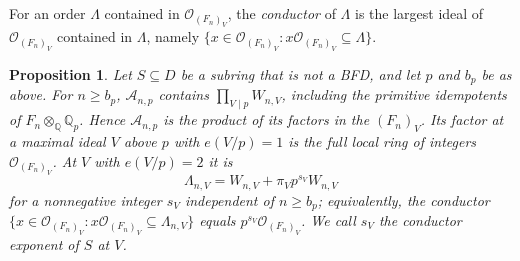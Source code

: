 \documentclass[11pt]{article}
\theoremstyle{plain}
\newtheorem{proposition}[theorem]{Proposition}
\theoremstyle{definition}
\theoremstyle{remark}
\newcommand{\Q}{\mathbb Q}
\newcommand{\OO}{\mathcal O}
\begin{document}
For an order $\Lambda$ contained in $\OO_{(F_n)_V}$, the
\emph{conductor} of $\Lambda$ is the largest ideal of $\OO_{(F_n)_V}$
contained in $\Lambda$, namely
$\{x\in\OO_{(F_n)_V}:x\OO_{(F_n)_V}\subseteq\Lambda\}$.

\begin{proposition}\label{prop:orders}
Let $S\subseteq D$ be a subring that is not a BFD, and let $p$ and $b_p$
be as above.  For $n\geq b_p$, $\mathcal A_{n,p}$ contains
$\prod_{V\mid p}W_{n,V}$, including the primitive idempotents of
$F_n\otimes_\Q\Q_p$.  Hence $\mathcal A_{n,p}$ is the product of its
factors in the $(F_n)_V$.  Its factor at a maximal ideal $V$ above $p$
with $e(V/p)=1$ is the full local ring of integers $\OO_{(F_n)_V}$.  At
$V$ with $e(V/p)=2$ it is
\begin{equation}\label{eq:localorder}
 \Lambda_{n,V}=W_{n,V}+\pi_Vp^{s_V}W_{n,V}
\end{equation}
for a nonnegative integer $s_V$ independent of $n\geq b_p$;
equivalently, the conductor
$\{x\in\OO_{(F_n)_V}:x\OO_{(F_n)_V}\subseteq\Lambda_{n,V}\}$ equals
$p^{s_V}\OO_{(F_n)_V}$.  We call $s_V$ the \emph{conductor exponent} of $S$
at $V$.
\end{proposition}
\end{document}
